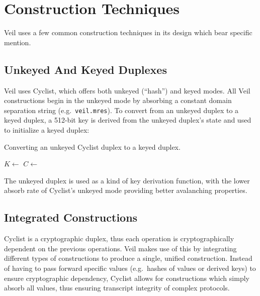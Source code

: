 \section{Construction Techniques}\label{sec:construction-techniques}

Veil uses a few common construction techniques in its design which bear specific mention.

\subsection{Unkeyed And Keyed Duplexes}\label{subsec:cons-keyed-duplexes}

Veil uses Cyclist, which offers both unkeyed \@(``hash'') and keyed modes.
All Veil constructions begin in the unkeyed mode by absorbing a constant domain separation string
(e.g.\ \texttt{veil.mres}).
To convert from an unkeyed duplex to a keyed duplex, a 512-bit key is derived from the unkeyed
duplex's state and used to initialize a keyed duplex:

\begin{algorithm}
    \caption{Converting an unkeyed Cyclist duplex to a keyed duplex.}
    \begin{algorithmic}
        \State {}
        \State {}
        \State $K \gets $ 
        \State {}
        \State $C \gets $ 
    \end{algorithmic}
    \label{alg:duplex-convert}
\end{algorithm}

The unkeyed duplex is used as a kind of key derivation function, with the lower absorb rate of
Cyclist's unkeyed mode providing better avalanching properties.

\subsection{Integrated Constructions}\label{subsec:cons-integrated-constructions}

Cyclist is a cryptographic duplex, thus each operation is cryptographically dependent on the
previous operations.
Veil makes use of this by integrating different types of constructions to produce a single, unified
construction.
Instead of having to pass forward specific values \@(e.g.\ hashes of values or derived keys) to
ensure cryptographic dependency, Cyclist allows for constructions which simply absorb all values,
thus ensuring transcript integrity of complex protocols.

